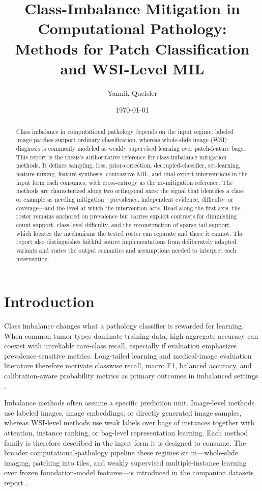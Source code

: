\documentclass[11pt]{article}
\title{Class-Imbalance Mitigation in Computational Pathology:\\
Methods for Patch Classification and WSI-Level MIL}
\author{Yannik Queisler}
\date{\today}
\begin{document}
\maketitle

\begin{abstract}
\noindent Class imbalance in computational pathology depends on the input regime: labeled image patches support ordinary classification, whereas whole-slide image (WSI) diagnosis is commonly modeled as weakly supervised learning over patch-feature bags. This report is the thesis's authoritative reference for class-imbalance mitigation methods. It defines sampling, loss, prior-correction, decoupled-classifier, set-learning, feature-mixing, feature-synthesis, contrastive-MIL, and dual-expert interventions in the input form each consumes, with cross-entropy as the no-mitigation reference. The methods are characterized along two orthogonal axes: the signal that identifies a class or example as needing mitigation---prevalence, independent evidence, difficulty, or coverage---and the level at which the intervention acts. Read along the first axis, the roster remains anchored on prevalence but carries explicit contrasts for diminishing count support, class-level difficulty, and the reconstruction of sparse tail support, which locates the mechanisms the tested roster can separate and those it cannot. The report also distinguishes faithful source implementations from deliberately adapted variants and states the output semantics and assumptions needed to interpret each intervention.
\end{abstract}

\setcounter{tocdepth}{2}
\tableofcontents
\clearpage

\section{Introduction}
Class imbalance changes what a pathology classifier is rewarded for learning. When common tumor types dominate training data, high aggregate accuracy can coexist with unreliable rare-class recall, especially if evaluation emphasizes prevalence-sensitive metrics. Long-tailed learning and medical-image evaluation literature therefore motivate classwise recall, macro F1, balanced accuracy, and calibration-aware probability metrics as primary outcomes in imbalanced settings \citep{saini2023tacklingClass,zhang2023deepLong,mosquera2024classImbalance}.

Imbalance methods often assume a specific prediction unit. Image-level methods use labeled images, image embeddings, or directly generated image samples, whereas WSI-level methods use weak labels over bags of instances together with attention, instance ranking, or bag-level representation learning. Each method family is therefore described in the input form it is designed to consume. The broader computational-pathology pipeline these regimes sit in---whole-slide imaging, patching into tiles, and weakly supervised multiple-instance learning over frozen foundation-model features---is introduced in the companion datasets report \citep{queisler2026datasets}.
\end{document}
